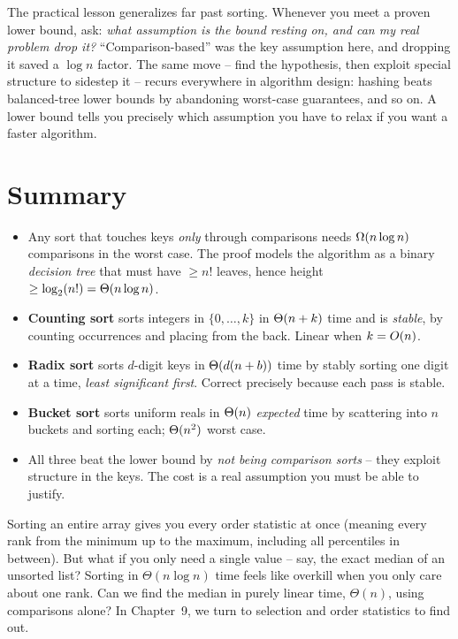 \begin{aestheticbox}
The practical lesson generalizes far past sorting. Whenever you meet a proven
lower bound, ask: \emph{what assumption is the bound resting on, and can my real
problem drop it?} ``Comparison-based'' was the key assumption
here, and dropping it saved a $\log n$ factor. The same move -- find the
hypothesis, then exploit special structure to sidestep it -- recurs everywhere
in algorithm design: hashing beats balanced-tree lower bounds by abandoning
worst-case guarantees, and so on. A lower bound tells you precisely which
assumption you have to relax if you want a faster algorithm.
\end{aestheticbox}

\section*{Summary}

\begin{itemize}
\item Any sort that touches keys \emph{only} through comparisons needs
$\Omega(n\log n)$ comparisons in the worst case. The proof models the algorithm as
a binary \emph{decision tree} that must have $\ge n!$ leaves, hence height
$\ge \log_2(n!) = \Theta(n\log n)$.
\item \textbf{Counting sort} sorts integers in $\{0,\dots,k\}$ in $\Theta(n+k)$
time and is \emph{stable}, by counting occurrences and placing from the back.
Linear when $k = O(n)$.
\item \textbf{Radix sort} sorts $d$-digit keys in $\Theta(d(n+b))$ time by stably
sorting one digit at a time, \emph{least significant first}. Correct precisely
because each pass is stable.
\item \textbf{Bucket sort} sorts uniform reals in $\Theta(n)$ \emph{expected} time
by scattering into $n$ buckets and sorting each; $\Theta(n^2)$ worst case.
\item All three beat the lower bound by \emph{not being comparison sorts} --
they exploit structure in the keys. The cost is a real assumption you must be
able to justify.
\end{itemize}

Sorting an entire array gives you every order statistic at once (meaning every rank from the minimum up to the maximum, including all percentiles in between). But what if you only need a single value
-- say, the exact median of an unsorted list? Sorting in $\Theta(n \log n)$ time
feels like overkill when you only care about one rank. Can we find the median in
purely linear time, $\Theta(n)$, using comparisons alone? In Chapter~9, we turn
to selection and order statistics to find out.

